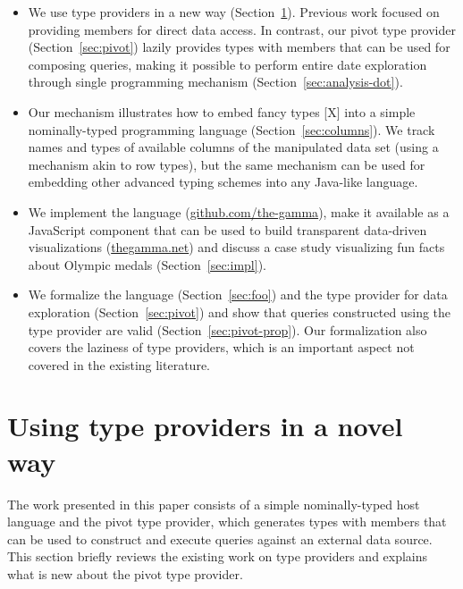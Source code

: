 \documentclass[a4paper,UKenglish]{lipics-v2016}
\theoremstyle{plain}
\theoremstyle{definition}
\begin{document}
\begin{itemize}
\item We use type providers in a new way (Section~\ref{sec:tps}). Previous work focused on providing 
  members for direct data access. In contrast, our pivot type provider (Section~\ref{sec:pivot}) lazily 
  provides types with members that can be used for composing queries, making it possible to perform
  entire date exploration through single programming mechanism (Section~\ref{sec:analysis-dot}).  

\item Our mechanism illustrates how to embed fancy types [X] into a simple nominally-typed programming  
  language (Section~\ref{sec:columns}). We track names and types of available columns of the 
  manipulated data set (using a mechanism akin to row types), but the same mechanism can be used for 
  embedding other advanced typing schemes into any Java-like language.
  
\item We implement the language (\url{github.com/the-gamma}), make it available as a JavaScript 
  component that can be used to build transparent data-driven visualizations (\url{thegamma.net}) 
  and discuss a case study visualizing fun facts about Olympic medals (Section~\ref{sec:impl}).

\item We formalize the language (Section~\ref{sec:foo}) and the type provider for data exploration
  (Section~\ref{sec:pivot}) and show that queries constructed using the type provider are valid
  (Section~\ref{sec:pivot-prop}). Our formalization also covers the laziness of type providers, which
  is an important aspect not covered in the existing literature.
\end{itemize}


\section{Using type providers in a novel way}
\label{sec:tps}

The work presented in this paper consists of a simple nominally-typed host language and the pivot
type provider, which generates types with members that can be used to construct and execute queries
against an external data source. This section briefly reviews the existing work on type providers
and explains what is new about the pivot type provider.
\end{document}
